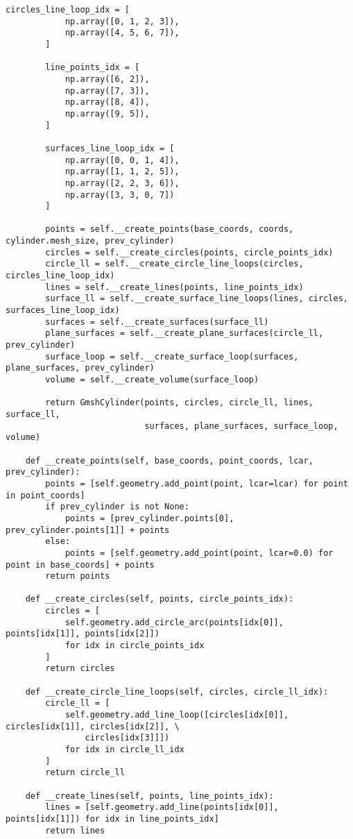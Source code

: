 \begin{lstlisting}[caption=Исходный код модуля генерации расчетной сетки и её маркировки, 
                    label={lst_meshgen_all}, basicstyle=\scriptsize]
        circles_line_loop_idx = [
            np.array([0, 1, 2, 3]),
            np.array([4, 5, 6, 7]),
        ]

        line_points_idx = [
            np.array([6, 2]),
            np.array([7, 3]),
            np.array([8, 4]),
            np.array([9, 5]),
        ]

        surfaces_line_loop_idx = [
            np.array([0, 0, 1, 4]),
            np.array([1, 1, 2, 5]),
            np.array([2, 2, 3, 6]),
            np.array([3, 3, 0, 7])
        ]

        points = self.__create_points(base_coords, coords, cylinder.mesh_size, prev_cylinder)
        circles = self.__create_circles(points, circle_points_idx)
        circle_ll = self.__create_circle_line_loops(circles, circles_line_loop_idx)
        lines = self.__create_lines(points, line_points_idx)
        surface_ll = self.__create_surface_line_loops(lines, circles, surfaces_line_loop_idx)
        surfaces = self.__create_surfaces(surface_ll)
        plane_surfaces = self.__create_plane_surfaces(circle_ll, prev_cylinder)
        surface_loop = self.__create_surface_loop(surfaces, plane_surfaces, prev_cylinder)
        volume = self.__create_volume(surface_loop)

        return GmshCylinder(points, circles, circle_ll, lines, surface_ll,
                            surfaces, plane_surfaces, surface_loop, volume)

    def __create_points(self, base_coords, point_coords, lcar, prev_cylinder):
        points = [self.geometry.add_point(point, lcar=lcar) for point in point_coords]
        if prev_cylinder is not None:
            points = [prev_cylinder.points[0], prev_cylinder.points[1]] + points
        else:
            points = [self.geometry.add_point(point, lcar=0.0) for point in base_coords] + points
        return points

    def __create_circles(self, points, circle_points_idx):
        circles = [
            self.geometry.add_circle_arc(points[idx[0]], points[idx[1]], points[idx[2]])
            for idx in circle_points_idx
        ]
        return circles

    def __create_circle_line_loops(self, circles, circle_ll_idx):
        circle_ll = [
            self.geometry.add_line_loop([circles[idx[0]], circles[idx[1]], circles[idx[2]], \
                circles[idx[3]]])
            for idx in circle_ll_idx
        ]
        return circle_ll

    def __create_lines(self, points, line_points_idx):
        lines = [self.geometry.add_line(points[idx[0]], points[idx[1]]) for idx in line_points_idx]
        return lines


\end{lstlisting}

